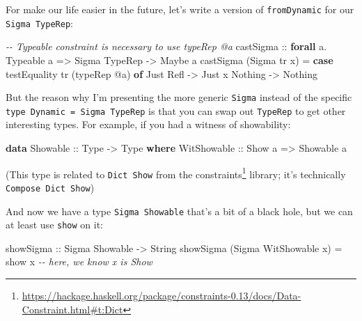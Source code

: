 \documentclass[]{article}
\newenvironment{Shaded}{}{}
\newcommand{\CommentTok}[1]{\textcolor[rgb]{0.38,0.63,0.69}{\textit{#1}}}
\newcommand{\DataTypeTok}[1]{\textcolor[rgb]{0.56,0.13,0.00}{#1}}
\newcommand{\FunctionTok}[1]{\textcolor[rgb]{0.02,0.16,0.49}{#1}}
\newcommand{\KeywordTok}[1]{\textcolor[rgb]{0.00,0.44,0.13}{\textbf{#1}}}
\newcommand{\NormalTok}[1]{#1}
\newcommand{\OperatorTok}[1]{\textcolor[rgb]{0.40,0.40,0.40}{#1}}
\newcommand{\OtherTok}[1]{\textcolor[rgb]{0.00,0.44,0.13}{#1}}
\renewcommand{\href}[2]{#2\footnote{\url{#1}}}
\begin{document}
For make our life easier in the future, let's write a version of
\texttt{fromDynamic} for our \texttt{Sigma\ TypeRep}:

\begin{Shaded}
\begin{Highlighting}[]
\CommentTok{{-}{-} Typeable constraint is necessary to use typeRep @a}
\OtherTok{castSigma ::} \KeywordTok{forall}\NormalTok{ a}\OperatorTok{.} \DataTypeTok{Typeable}\NormalTok{ a }\OtherTok{=>} \DataTypeTok{Sigma} \DataTypeTok{TypeRep} \OtherTok{{-}>} \DataTypeTok{Maybe}\NormalTok{ a}
\NormalTok{castSigma (}\DataTypeTok{Sigma}\NormalTok{ tr x) }\OtherTok{=} \KeywordTok{case}\NormalTok{ testEquality tr (typeRep }\OperatorTok{@}\NormalTok{a) }\KeywordTok{of}
    \DataTypeTok{Just} \DataTypeTok{Refl} \OtherTok{{-}>} \DataTypeTok{Just}\NormalTok{ x}
    \DataTypeTok{Nothing}   \OtherTok{{-}>} \DataTypeTok{Nothing}
\end{Highlighting}
\end{Shaded}

But the reason why I'm presenting the more generic \texttt{Sigma} instead of the
specific \texttt{type\ Dynamic\ =\ Sigma\ TypeRep} is that you can swap out
\texttt{TypeRep} to get other interesting types. For example, if you had a
witness of showability:

\begin{Shaded}
\begin{Highlighting}[]
\KeywordTok{data} \DataTypeTok{Showable}\OtherTok{ ::} \DataTypeTok{Type} \OtherTok{{-}>} \DataTypeTok{Type} \KeywordTok{where}
    \DataTypeTok{WitShowable}\OtherTok{ ::} \DataTypeTok{Show}\NormalTok{ a }\OtherTok{=>} \DataTypeTok{Showable}\NormalTok{ a}
\end{Highlighting}
\end{Shaded}

(This type is related to \texttt{Dict\ Show} from the
\href{https://hackage.haskell.org/package/constraints-0.13/docs/Data-Constraint.html\#t:Dict}{constraints}
library; it's technically \texttt{Compose\ Dict\ Show})

And now we have a type \texttt{Sigma\ Showable} that's a bit of a black hole,
but we can at least use \texttt{show} on it:

\begin{Shaded}
\begin{Highlighting}[]
\OtherTok{showSigma ::} \DataTypeTok{Sigma} \DataTypeTok{Showable} \OtherTok{{-}>} \DataTypeTok{String}
\NormalTok{showSigma (}\DataTypeTok{Sigma} \DataTypeTok{WitShowable}\NormalTok{ x) }\OtherTok{=} \FunctionTok{show}\NormalTok{ x       }\CommentTok{{-}{-} here, we know x is Show}
\end{Highlighting}
\end{Shaded}
\end{document}
